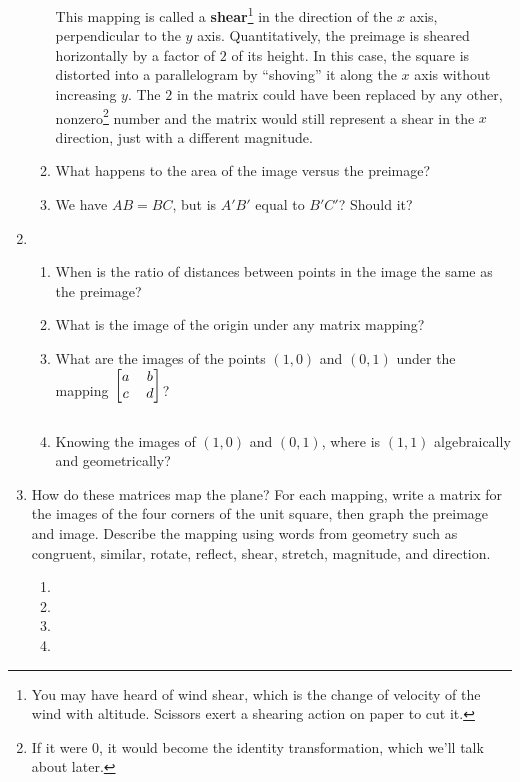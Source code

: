 \documentclass[../gatm.tex]{subfiles}
\begin{document}
\begin{enumerate}
\begin{enumerate}
This mapping is called a \textbf{shear}\footnote{You may have heard of wind shear, which is the change of velocity of the wind with altitude. Scissors exert a shearing action on paper to cut it.} in the direction of the $x$ axis, perpendicular to the $y$ axis. Quantitatively, the preimage is sheared horizontally by a factor of $2$ of its height.  In this case, the square is distorted into a parallelogram by ``shoving'' it along the $x$ axis without increasing $y$. The $2$ in the matrix could have been replaced by any other, nonzero\footnote{If it were $0$, it would become the identity transformation, which we'll talk about later.} number and the matrix would still represent a shear in the $x$ direction, just with a different magnitude.
\item What happens to the area of the image versus the preimage?
\item We have $AB=BC$, but is $A'B'$ equal to $B'C'$? Should it?
\end{enumerate}
\item \begin{enumerate}
\item When is the ratio of distances between points in the image the same as the preimage?
\item What is the image of the origin under any matrix mapping?
\item What are the images of the points $(1,0)$ and $(0,1)$ under the mapping $\begin{blockarray}{[cc]} a & b \\ c & d \end{blockarray}$?
\item Knowing the images of $(1,0)$ and $(0,1)$, where is $(1,1)$ algebraically and geometrically?
\end{enumerate}
\item How do these matrices map the plane? For each mapping, write a matrix for the images of the four corners of the unit square, then graph the preimage and image. Describe the mapping using words from geometry such as congruent, similar, rotate, reflect, shear, stretch, magnitude, and direction. \label{prob:map_plane_sixteen_matrices}
\begin{multicols}{4}
\begin{enumerate}
\item {}
\item {}
\item {}
\item {}

\end{enumerate}
\end{multicols}
\end{enumerate}
\end{document}
